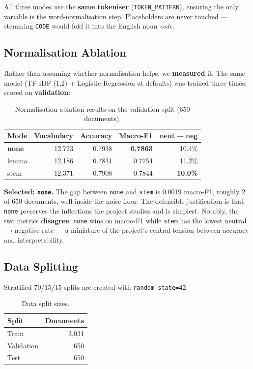 \documentclass[11pt,a4paper]{article}
\begin{document}
All three modes use the \textbf{same tokeniser} (\texttt{TOKEN\_PATTERN}), ensuring the only variable is the word-normalisation step. Placeholders are never touched --- stemming \texttt{CODE} would fold it into the English noun \textit{code}.

\subsection{Normalisation Ablation}

Rather than assuming whether normalisation helps, we \textbf{measured} it. The same model (TF-IDF (1,2) + Logistic Regression at defaults) was trained three times, scored on \textbf{validation}:

\begin{table}[H]
\centering
\caption{Normalisation ablation results on the validation split (650 documents).}
\label{tab:ablation}
\begin{tabular}{lrrrr}
\toprule
\textbf{Mode} & \textbf{Vocabulary} & \textbf{Accuracy} & \textbf{Macro-F1} & \textbf{neut$\rightarrow$neg} \\
\midrule
\textbf{none} & 12,723 & 0.7938 & \textbf{0.7863} & 10.4\% \\
lemma          & 12,186 & 0.7831 & 0.7754 & 11.2\% \\
stem           & 12,371 & 0.7908 & 0.7844 & \textbf{10.0\%} \\
\bottomrule
\end{tabular}
\end{table}

\textbf{Selected: \texttt{none}.} The gap between \texttt{none} and \texttt{stem} is 0.0019 macro-F1, roughly 2 of 650 documents, well inside the noise floor. The defensible justification is that \texttt{none} preserves the inflections the project studies and is simplest. Notably, the two metrics \textbf{disagree}: \texttt{none} wins on macro-F1 while \texttt{stem} has the lowest neutral$\rightarrow$negative rate --- a miniature of the project's central tension between accuracy and interpretability.

\subsection{Data Splitting}

Stratified 70/15/15 splits are created with \texttt{random\_state=42}:

\begin{table}[H]
\centering
\caption{Data split sizes.}
\begin{tabular}{lr}
\toprule
\textbf{Split} & \textbf{Documents} \\
\midrule
Train & 3,031 \\
Validation & 650 \\
Test & 650 \\
\bottomrule
\end{tabular}
\end{table}
\end{document}
